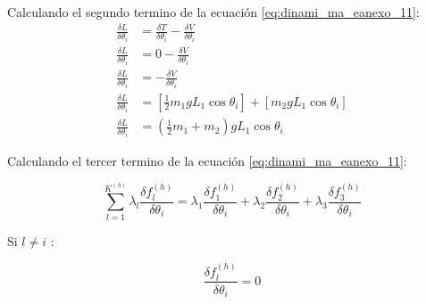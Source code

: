             Calculando el segundo termino de la ecuación \ref{eq:dinami_ma_eanexo_11}:
            \begin{align*}
             \frac{ \delta L}{ \delta  \theta _{i}}&=\frac{ \delta T}{ \delta  \theta _{i}}-\frac{ \delta V}{ \delta  \theta _{i}} \\
             \frac{ \delta L}{ \delta  \theta _{i}}&=0-\frac{ \delta V}{ \delta  \theta _{i}} \\
             \frac{ \delta L}{ \delta  \theta _{i}}&=-\frac{ \delta V}{ \delta  \theta _{i}}\\
             \frac{ \delta L}{ \delta  \theta _{i}}&= \left[ \frac{1}{2}m_{1}gL_{1}\cos  \theta _{i} \right] + \left[ m_{2}gL_{1}\cos  \theta _{i} \right]  \\
              \frac{ \delta L}{ \delta  \theta _{i}}&= \left( \frac{1}{2}m_{1}+m_{2} \right) gL_{1}\cos  \theta _{i}
             \end{align*}
 
         \newpage

            Calculando el tercer termino de la ecuación \ref{eq:dinami_ma_eanexo_11}:
            
             \[  \sum _{l=1}^{K^{ \left( h \right) }} \lambda _{l}\frac{ \delta f_{l}^{ \left( h \right) }}{ \delta  \theta _{i}}= \lambda _{1}\frac{ \delta f_{1}^{ \left( h \right) }}{ \delta  \theta _{i}}+ \lambda _{2}\frac{ \delta f_{2}^{ \left( h \right) }}{ \delta  \theta _{i}}+ \lambda _{3}\frac{ \delta f_{3}^{ \left( h \right) }}{ \delta  \theta _{i}} \] 
            
            Si  \( l \neq i \) :
            
             \[ \frac{ \delta f_{l}^{ \left( h \right) }}{ \delta  \theta _{i}}=0 \] 
        
